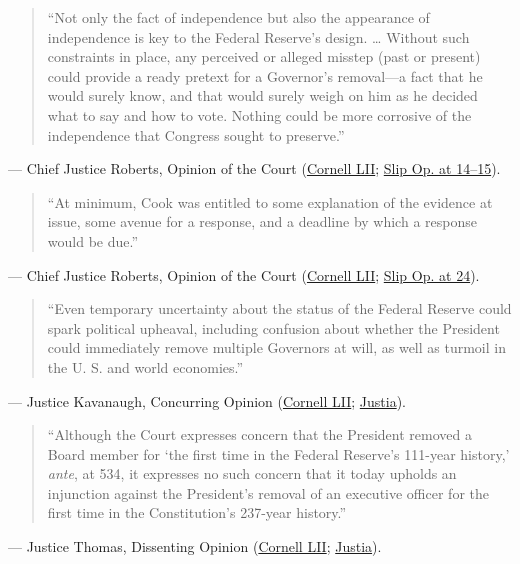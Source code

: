 \documentclass[12pt]{article}
\begin{document}
\begin{quote}
``Not only the fact of independence but also the appearance of independence is key to the Federal Reserve's design. \ldots{} Without such constraints in place, any perceived or alleged misstep (past or present) could provide a ready pretext for a Governor's removal---a fact that he would surely know, and that would surely weigh on him as he decided what to say and how to vote. Nothing could be more corrosive of the independence that Congress sought to preserve.''
\end{quote}
\noindent --- Chief Justice Roberts, Opinion of the Court (\href{https://www.law.cornell.edu/supremecourt/text/25A312}{Cornell LII}; \href{https://www.supremecourt.gov/opinions/25pdf/25a312_5468.pdf}{Slip Op. at 14--15}).

\begin{quote}
``At minimum, Cook was entitled to some explanation of the evidence at issue, some avenue for a response, and a deadline by which a response would be due.''
\end{quote}
\noindent --- Chief Justice Roberts, Opinion of the Court (\href{https://www.law.cornell.edu/supremecourt/text/25A312}{Cornell LII}; \href{https://www.supremecourt.gov/opinions/25pdf/25a312_5468.pdf}{Slip Op. at 24}).

\begin{quote}
``Even temporary uncertainty about the status of the Federal Reserve could spark political upheaval, including confusion about whether the President could immediately remove multiple Governors at will, as well as turmoil in the U. S. and world economies.''
\end{quote}
\noindent --- Justice Kavanaugh, Concurring Opinion (\href{https://www.law.cornell.edu/supremecourt/text/25A312}{Cornell LII}; \href{https://supreme.justia.com/cases/federal/us/609/25a312/}{Justia}).

\begin{quote}
``Although the Court expresses concern that the President removed a Board member for `the first time in the Federal Reserve's 111-year history,' \textit{ante}, at 534, it expresses no such concern that it today upholds an injunction against the President's removal of an executive officer for the first time in the Constitution's 237-year history.''
\end{quote}
\noindent --- Justice Thomas, Dissenting Opinion (\href{https://www.law.cornell.edu/supremecourt/text/25A312}{Cornell LII}; \href{https://supreme.justia.com/cases/federal/us/609/25a312/}{Justia}).
\end{document}

